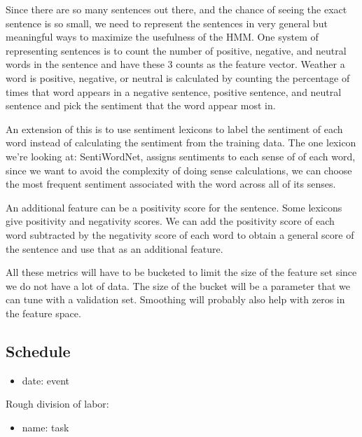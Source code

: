 \documentclass{article}
\begin{document}
\begin{itemize}
Since there are so many sentences out there, and the chance of seeing the exact sentence is so small, we need to represent the sentences in very general but meaningful ways to maximize the usefulness of the HMM. One system of representing sentences is to count the number of positive, negative, and neutral words in the sentence and have these 3 counts as the feature vector. Weather a word is positive, negative, or neutral is calculated by counting the percentage of times that word appears in a negative sentence, positive sentence, and neutral sentence and pick the sentiment that the word appear most in.

An extension of this is to use sentiment lexicons to label the sentiment of each word instead of calculating the sentiment from the training data. The one lexicon we're looking at: SentiWordNet, assigns sentiments to each sense of of each word, since we want to avoid the complexity of doing sense calculations, we can choose the most frequent sentiment associated with the word across all of its senses.

An additional feature can be a positivity score for the sentence. Some lexicons give positivity and negativity scores. We can add the positivity score of each word subtracted by the negativity score of each word to obtain a general score of the sentence and use that as an additional feature.

All these metrics will have to be bucketed to limit the size of the feature set since we do not have a lot of data. The size of the bucket will be a parameter that we can tune with a validation set. Smoothing will probably also help with zeros in the feature space.
\end{itemize}

\subsection*{Schedule}

\begin{itemize}[noitemsep,nolistsep]
\item date: event
\end{itemize}

Rough division of labor:
\begin{itemize}[noitemsep,nolistsep]
\item name: task
\end{itemize}
\end{document}
